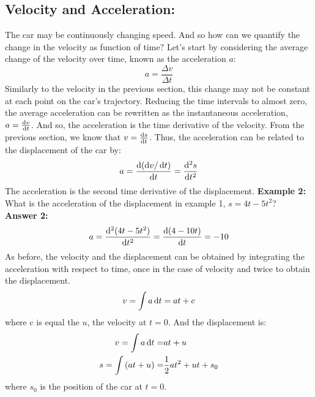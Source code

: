 \subsection{Velocity and Acceleration:}
The car may be continuously changing speed. And so how can we quantify the change in the velocity as function of time? Let's start by considering the average change of the velocity over time, known as the acceleration $a$:
\begin{equation}
a = \frac{\Delta v}{\Delta t} 
\end{equation}
\nl
Similarly to the velocity in the previous section, this change may not be constant at each point on the car's trajectory. Reducing the time intervals to almost zero, the average acceleration can be rewritten as the instantaneous acceleration, $a = \frac{\operatorname{d}\! v}{\operatorname{d}\! t}$. And so, the acceleration is the time derivative of the velocity. From the previous section, we know that $v = \frac{\operatorname{d}\! s}{\operatorname{d}\! t}$. Thus, the acceleration can be related to the displacement of the car by:
 \begin{equation}
a = \frac{\operatorname{d}\! \left(\operatorname{d}\! v/ \operatorname{d}\! t\right)}{\operatorname{d}\! t} = \frac{\operatorname{d}\!^2 s}{\operatorname{d}\! t^2} 
\end{equation}
 The acceleration is the second time derivative of the displacement. 
\nll
\textbf{Example 2:} What is the acceleration of the displacement in example 1, $s = 4t - 5 t^2$?\\
\textbf{Answer 2:} 
\begin{equation}
a = \frac{\operatorname{d}\!^2 (4t - 5 t^2)}{\operatorname{d}\! t^2} = \frac{\operatorname{d}\! \left(4-10t\right)}{\operatorname{d}\! t} = - 10
\end{equation}
\nl
As before, the velocity and the displacement can be obtained by integrating the acceleration with respect to time, once in the case of velocity and twice to obtain the displacement.
  \begin{equation}
v = \int a \operatorname{d}\! t = at + c
\label{vel}
\end{equation}
where c is equal the $u$, the velocity at $t=0$. And the displacement is:
 \begin{eqnarray}
v = \int a \operatorname{d}\! t =& at + u\\
s = \int \left(at + u\right) =& \frac{1}{2} a t^2 + u t + s_0
\label{s}
\end{eqnarray}
where $s_0$ is the position of the car at $t=0$. 

